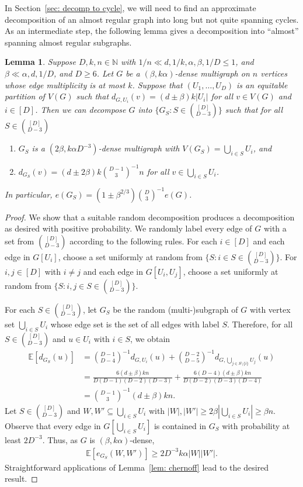 \documentclass[a4paper, 11pt, reqno]{amsart}
\newtheorem{lemma}[definition]{Lemma}
\numberwithin{equation}{section}
\newcommand{\1}{{\rm 1\hspace*{-0.4ex}%
\rule{0.1ex}{1.52ex}\hspace*{0.2ex}}}
\newcommand{\N}{\mathbb N}
\newcounter{step}
\begin{document}
In Section~\ref{sec: decomp to cycle}, we will need to find an approximate decomposition of an almost regular graph into long but not quite spanning cycles. As an intermediate step, the following lemma gives a decomposition into ``almost'' spanning almost regular subgraphs.


\begin{lemma}\label{lem: D partition}
Suppose $D,k,n\in \N$ with $1/n\ll d,1/k,\alpha,\beta, 1/D \leq 1$, and $\beta\ll \alpha,d,1/D$, and $D\geq 6$.
Let $G$ be a $(\beta,k\alpha)$-dense multigraph on $n$ vertices whose edge multiplicity is at most $k$. 
Suppose that $(U_1,\dots, U_D)$ is an equitable partition of $V(G)$ such that $d_{G,U_i}(v)= (d\pm \beta)k|U_i|$ for all $v\in V(G)$ and $i\in [D]$.
Then we can decompose $G$ into $\{ G_S : S\in \binom{[D]}{D-3}\}$ such that for all $S\in \binom{[D]}{D-3}$
\begin{enumerate}[label=(\Roman*)]
\item $G_S$ is a $(2\beta,k\alpha D^{-3})$-dense multigraph with $V(G_S)=\bigcup_{i\in S}U_i$, and
\item $d_{G_S}(v) = (d\pm 2\beta)k\binom{D-1}{3}^{-1}n$ for all $v\in \bigcup_{i\in S}U_i$.
\end{enumerate}
In particular,
$e(G_S)=(1\pm \beta^{2/3})\binom{D}{3}^{-1}e(G)$.
\end{lemma}
\begin{proof}
We show that a suitable random decomposition produces a decomposition as desired with positive probability.
We randomly label every edge of $G$ with a set from $\binom{[D]}{D-3}$ according to the following rules.
For each $i\in [D]$ and each edge in $G[U_i]$,
choose a set uniformly at random from $\{S: i \in S \in \binom{[D]}{D-3}\}$.
For $i,j\in [D]$ with $i\neq j$ and each edge in $G[U_i,U_j]$,
choose a set uniformly at random from $\{S: i,j \in S \in \binom{[D]}{D-3}\}$.

For each $S\in \binom{[D]}{D-3}$, 
let $G_S$ be the random (multi-)subgraph of $G$ with vertex set $\bigcup_{i\in S} U_i$ whose edge set is the set of all edges with label $S$. Therefore,
for all $S\in \binom{[D]}{D-3}$ and $u\in U_i$ with $i\in S$, we obtain
\begin{align*}
\mathbb{E}[d_{G_S}(u)] 
&= \binom{D-1}{D-4}^{-1} d_{G,U_i}(u)+ \binom{D-2}{D-5}^{-1} d_{G,\bigcup_{j\in S\setminus\{i\}}U_j}(u )\\
&= \frac{6(d\pm \beta)kn}{D(D-1)(D-2)(D-3)} +\frac{6(D-4)(d\pm \beta)kn}{D(D-2)(D-3)(D-4)}\\
&=\binom{D-1}{3}^{-1}(d\pm \beta)kn.
\end{align*}
Let $S\in \binom{[D]}{D-3}$ and $W,W'\subseteq \bigcup_{i\in S} U_i$ with $|W|,|W'|\geq 2\beta |\bigcup_{i\in S} U_i| \geq \beta n$.
Observe that every edge in $G[\bigcup_{i\in S} U_i]$ is contained in $G_S$ with probability at least $2D^{-3}$.
Thus, as $G$ is $(\beta,k\alpha)$-dense,
\begin{align*}
\mathbb{E}[e_{G_S}(W,W')]  \geq 2D^{-3} k\alpha|W||W'|.
\end{align*}
Straightforward applications of Lemma~\ref{lem: chernoff}
lead to the desired result.
\end{proof}
\end{document}
